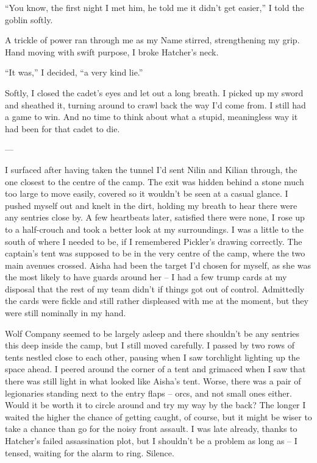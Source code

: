 \documentclass[12pt, openany]{book}
\begin{document}
“You know, the first night I met him, he told me it didn’t get easier,” I told the goblin softly.

A trickle of power ran through me as my Name stirred, strengthening my grip. Hand moving with swift purpose, I broke Hatcher’s neck.

“It was,” I decided, “a very kind lie.”

Softly, I closed the cadet’s eyes and let out a long breath. I picked up my sword and sheathed it, turning around to crawl back the way I’d come from. I still had a game to win. And no time to think about what a stupid, meaningless way it had been for that cadet to die.

—

I surfaced after having taken the tunnel I’d sent Nilin and Kilian through, the one closest to the centre of the camp.
The exit was hidden behind a stone much too large to move easily, covered so it wouldn’t be seen at a casual glance. I pushed myself out and knelt in the dirt, holding my breath to hear there were any sentries close by. A few heartbeats later, satisfied there were none, I rose up to a half-crouch and took a better look at my surroundings. I was a little to the south of where I needed to be, if I remembered Pickler’s drawing correctly. The captain’s tent was supposed to be in the very centre of the camp, where the two main avenues crossed. Aisha had been the target I’d chosen for myself, as she was the most likely to have guards around her – I had a few trump cards at my disposal that the rest of my team didn’t if things got out of control. Admittedly the cards were fickle and still rather displeased with me at the moment, but they were still nominally in my hand.

Wolf Company seemed to be largely asleep and there shouldn’t be any sentries this deep inside the camp, but I still moved carefully. I passed by two rows of tents nestled close to each other, pausing when I saw torchlight lighting up the space ahead. I peered around the corner of a tent and grimaced when I saw that there was still light in what looked like Aisha’s tent. Worse, there was a pair of legionaries standing next to the entry flaps – orcs, and not small ones either. Would it be worth it to circle around and try my way by the back? The longer I waited the higher the chance of getting caught, of course, but it might be wiser to take a chance than go for the noisy front assault. I was late already, thanks to Hatcher’s failed assassination plot, but I shouldn’t be a problem as long as – I tensed, waiting for the alarm to ring. Silence.
\end{document}
